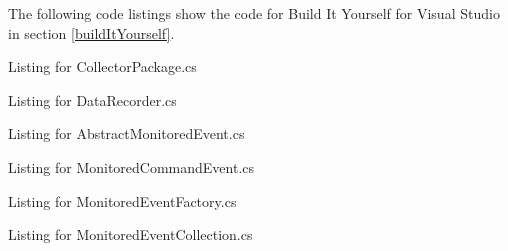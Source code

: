 The following code listings show the code for Build It Yourself for Visual Studio in section \ref{buildItYourself}.

Listing for CollectorPackage.cs


\newpage
Listing for DataRecorder.cs


\newpage
Listing for AbstractMonitoredEvent.cs


\newpage
Listing for MonitoredCommandEvent.cs


\newpage
Listing for MonitoredEventFactory.cs


\newpage
Listing for MonitoredEventCollection.cs


